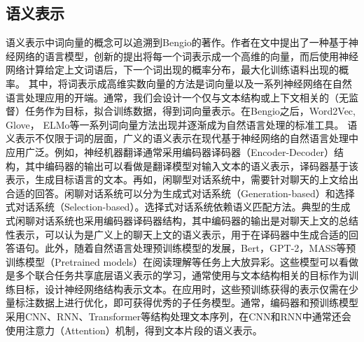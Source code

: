 \subsection{语义表示}
语义表示中词向量的概念可以追溯到Bengio的著作\cite{ bengio2003neural}。作者在文中提出了一种基于神经网络的语言模型，创新的提出将每一个词表示成一个高维的向量，而后使用神经网络计算给定上文词语后，下一个词出现的概率分布，最大化训练语料出现的概率。
其中，将词表示成高维实数向量的方法是词向量以及一系列神经网络在自然语言处理应用的开端。通常，我们会设计一个仅与文本结构或上下文相关的（无监督）任务作为目标，拟合训练数据，得到词向量表示。在Bengio之后，Word2Vec\cite{ mikolov2013distributed}, Glove\cite{ pennington2014glove}， ELMo\cite{ peters2018deep}等一系列词向量方法出现并逐渐成为自然语言处理的标准工具。
语义表示不仅限于词的层面，广义的语义表示在现代基于神经网络的自然语言处理中应用广泛。例如，神经机器翻译通常采用编码器译码器（Encoder-Decoder）\cite{ sutskever2014sequence}结构，其中编码器的输出可以看做是翻译模型对输入文本的语义表示，译码器基于该表示，生成目标语言的文本。再如，闲聊型对话系统中，需要针对聊天的上文给出合适的回答。闲聊对话系统可以分为生成式对话系统（Generation-based）\cite{ shang2015neural}和选择式对话系统（Selection-based）\cite{ chen2017survey}。选择式对话系统依赖语义匹配方法。典型的生成式闲聊对话系统也采用编码器译码器结构，其中编码器的输出是对聊天上文的总结性表示，可以认为是广义上的聊天上文的语义表示，用于在译码器中生成合适的回答语句。此外，随着自然语言处理预训练模型的发展，Bert\cite{devlin2018bert}，GPT-2\cite{ radford2019language}，MASS\cite{ song2019mass}等预训练模型（Pretrained models）在阅读理解等任务上大放异彩。这些模型可以看做是多个联合任务共享底层语义表示的学习，通常使用与文本结构相关的目标作为训练目标，设计神经网络结构表示文本。在应用时，这些预训练获得的表示仅需在少量标注数据上进行优化，即可获得优秀的子任务模型。通常，编码器和预训练模型采用CNN、RNN、Transformer等结构处理文本序列，在CNN和RNN中通常还会使用注意力（Attention）机制，得到文本片段的语义表示。
%

